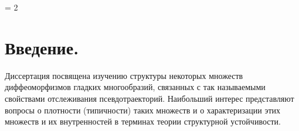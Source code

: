 \documentclass[12pt]{article}
\begin{document}
\frenchspacing \thispagestyle{empty}
\enlargethispage{1\baselineskip} \makeatletter

\righthyphenmin = 2

\newtheorem{thm}{Теорема }
\newtheorem{lem}{Лемма }
\newtheorem{utv}{Утверждение }
\newtheorem{zam}{Замечание }
\theoremstyle{definition}
\newtheorem{defin}{Определение }
\newtheorem{konstr}{Конструкция }
\newtheorem{primer}{Пример }

\renewcommand{\@makecaption}[2]{%
\vspace{\abovecaptionskip}%
\sbox{\@tempboxa}{#1. #2}

\ifdim \wd\@tempboxa > \hsize
   #1. #2 \par
\else
  \global\@minipagefalse
  \hbox to \hsize{\hfil #1. #2 \hfil}%
\fi

\vspace{\belowcaptionskip}}



 
\newenvironment{tm}[1]{\ifdim\lastskip<2.1pt\vskip%
                       -\lastskip\else\fi\vskip2pt\textsc{#1.}\em}{\vskip2pt}
\newenvironment{pr}[1]{\ifdim\lastskip<2.1pt\vskip%
                       -\lastskip\else\fi\vskip2pt\textsc{#1.}}{\vskip2pt}
\newenvironment{pf}[1]{\ifdim\lastskip<2.1pt\vskip%
                       -\lastskip\else\fi\vskip2pt\textsc{#1.}}{\vskip2pt}

\frenchspacing


\tableofcontents
\break
\section{Введение.}

Диссертация посвящена изучению структуры некоторых множеств диффеоморфизмов гладких многообразий, связанных с так называемыми свойствами отслеживания псевдотраекторий. Наибольший интерес представляют вопросы о плотности (типичности) таких множеств и о характеризации этих множеств и их внутренностей в терминах теории структурной устойчивости.
\end{document}
